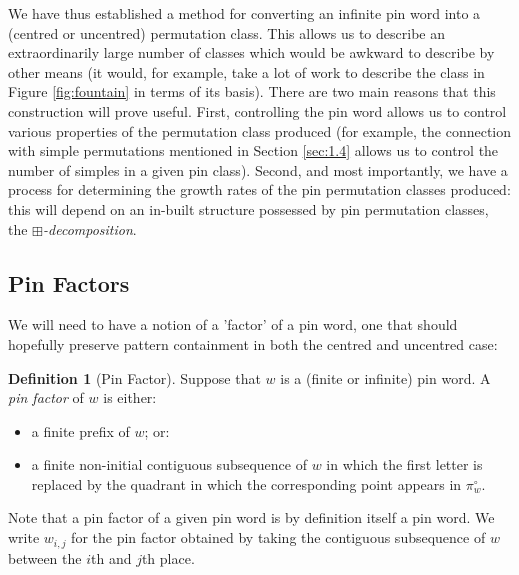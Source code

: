 \documentclass[11pt,a4paper]{article}
\theoremstyle{definition}
\newtheorem{defn}[thm]{Definition}
\begin{document}
We have thus established a method for converting an infinite pin word into a (centred or uncentred) permutation class. This allows us to describe an extraordinarily large number of classes which would be awkward to describe by other means (it would, for example, take a lot of work to describe the class in Figure \ref{fig:fountain} in terms of its basis). There are two main reasons that this construction will prove useful. First, controlling the pin word allows us to control various properties of the permutation class produced (for example, the connection with simple permutations mentioned in Section \ref{sec:1.4} allows us to control the number of simples in a given pin class). Second, and most importantly, we have a process for determining the growth rates of the pin permutation classes produced: this will depend on an in-built structure possessed by pin permutation classes, the \emph{$\boxplus$-decomposition}.

\subsection{Pin Factors} \label{sec:3.2}

We will need to have a notion of a 'factor' of a pin word, one that should hopefully preserve pattern containment in both the centred and uncentred case:

\begin{defn}[Pin Factor]
Suppose that $w$ is a (finite or infinite) pin word. A \emph{pin factor} of $w$ is either:
\begin{itemize}
\item a finite prefix of $w$; or:
\item a finite non-initial contiguous subsequence of $w$ in which the first letter is replaced by the quadrant in which the corresponding point appears in $\pi_{w}^{\circ}$.
\end{itemize}
\end{defn}

Note that a pin factor of a given pin word is by definition itself a pin word. We write $w_{i,j}$ for the pin factor obtained by taking the contiguous subsequence of $w$ between the $i$th and $j$th place.
\end{document}
